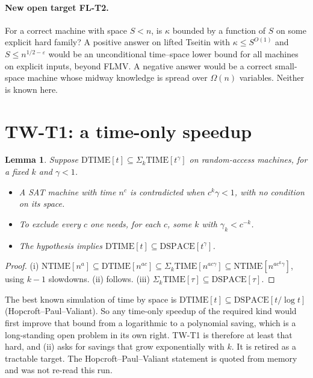 \documentclass[11pt]{article}
\newtheorem{lemma}[theorem]{Lemma}
\begin{document}
\paragraph{New open target FL-T2.} For a correct machine with space $S<n$, is $\kappa$ bounded by a function of $S$ on some explicit hard family? A positive answer on lifted Tseitin with $\kappa\le S^{O(1)}$ and $S\le n^{1/2-\varepsilon}$ would be an unconditional time--space lower bound for all machines on explicit inputs, beyond FLMV. A negative answer would be a correct small-space machine whose midway knowledge is spread over $\Omega(n)$ variables. Neither is known here.

\section{TW-T1: a time-only speedup}
\begin{lemma}\label{lem:tw1}
Suppose $\mathrm{DTIME}[t]\subseteq\Sigma_k\mathrm{TIME}[t^{\gamma}]$ on random-access machines, for a fixed $k$ and $\gamma<1$.
\begin{itemize}
\item[(i)] A SAT machine with time $n^{c}$ is contradicted when $c^{k}\gamma<1$, with no condition on its space.
\item[(ii)] To exclude every $c$ one needs, for each $c$, some $k$ with $\gamma_k<c^{-k}$.
\item[(iii)] The hypothesis implies $\mathrm{DTIME}[t]\subseteq\mathrm{DSPACE}[t^{\gamma}]$.
\end{itemize}
\end{lemma}
\begin{proof}
(i) $\mathrm{NTIME}[n^{a}]\subseteq\mathrm{DTIME}[n^{ac}]\subseteq\Sigma_k\mathrm{TIME}[n^{ac\gamma}]\subseteq\mathrm{NTIME}[n^{ac^{k}\gamma}]$, using $k-1$ slowdowns. (ii) follows. (iii) $\Sigma_k\mathrm{TIME}[\tau]\subseteq\mathrm{DSPACE}[\tau]$.
\end{proof}
The best known simulation of time by space is $\mathrm{DTIME}[t]\subseteq\mathrm{DSPACE}[t/\log t]$ (Hopcroft--Paul--Valiant). So any time-only speedup of the required kind would first improve that bound from a logarithmic to a polynomial saving, which is a long-standing open problem in its own right. TW-T1 is therefore at least that hard, and (ii) asks for savings that grow exponentially with $k$. It is retired as a tractable target. The Hopcroft--Paul--Valiant statement is quoted from memory and was not re-read this run.
\end{document}
